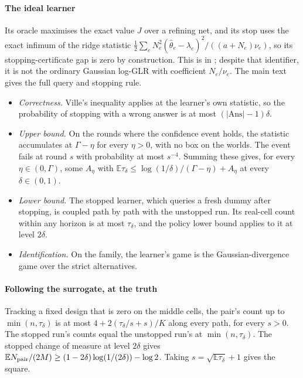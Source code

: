 \paragraph{The ideal learner} Its oracle maximises the exact value $J$ over a refining net, and
its stop uses the exact infimum of the ridge statistic
$\frac12\sum_e N_e^2(\widehat\theta_e-\lambda_e)^2/((a+N_e)\nu_e)$,
so its stopping-certificate gap is zero by construction. This is  in
; despite that identifier, it is not the ordinary Gaussian
log-GLR with coefficient $N_e/\nu_e$. The main text gives the full query and stopping rule.
\begin{itemize}
\item \emph{Correctness.} Ville's inequality applies at the learner's own statistic, so the
probability of stopping with a wrong answer is at most $(|\mathrm{Ans}|-1)\delta$.
\item \emph{Upper bound.} On the rounds where the confidence event holds, the statistic
accumulates at $\Gamma-\eta$ for every $\eta>0$, with no box on the worlds. The event fails at
round $s$ with probability at most $s^{-4}$. Summing these gives, for every
$\eta\in(0,\Gamma)$, some $A_{\eta}$ with
$\mathbb{E}\tau_{\delta}\le\log(1/\delta)/(\Gamma-\eta)+A_{\eta}$ at every $\delta\in(0,1)$.
\item \emph{Lower bound.} The stopped learner, which queries a fresh dummy after stopping, is
coupled path by path with the unstopped run. Its real-cell count within any horizon is at most
$\tau_{\delta}$, and the policy lower bound applies to it at level $2\delta$.
\item \emph{Identification.} On the family, the learner's game is the Gaussian-divergence game
over the strict alternatives.
\end{itemize}


\paragraph{Following the surrogate, at the truth} Tracking a fixed design that is zero on the
middle cells, the pair's count up to $\min(n,\tau_{\delta})$ is at most
$4+2(\tau_{\delta}/s+s)/K$ along every path, for every $s>0$. The stopped run's counts equal the
unstopped run's at $\min(n,\tau_{\delta})$. The stopped change of measure at level $2\delta$
gives $\mathbb{E}N_{\rm pair}/(2M)\ge(1-2\delta)\log(1/(2\delta))-\log2$. Taking
$s=\sqrt{\mathbb{E}\tau_{\delta}}+1$ gives the square.

